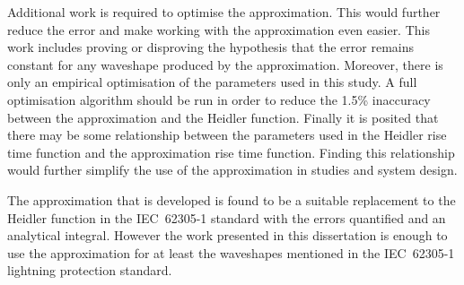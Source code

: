 Additional work is required to optimise the approximation. This would further reduce the error and make working with the approximation even easier. This work includes proving or disproving the hypothesis that the error remains constant for any waveshape produced by the approximation. Moreover, there is only an empirical optimisation of the parameters used in this study. A full optimisation algorithm should be run in order to reduce the 1.5\% inaccuracy between the approximation and the Heidler function. Finally it is posited that there may be some relationship between the parameters used in the Heidler rise time function and the approximation rise time function. Finding this relationship would further simplify the use of the approximation in studies and system design.

The approximation that is developed is found to be a suitable replacement to the Heidler function in the IEC~62305-1 standard with the errors quantified and an analytical integral.
However the work presented in this dissertation is enough to use the approximation for at least the waveshapes mentioned in the IEC~62305-1 lightning protection standard.
